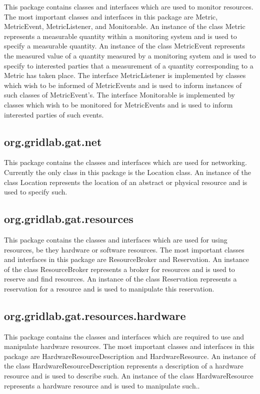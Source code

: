 \documentclass[$Date: 2003/06/26 19:29:31 $]{glabarticle}
\begin{document}
This package contains classes and interfaces which are used to monitor resources. The most important
classes and interfaces in this package are Metric, MetricEvent, MetricListener, and Monitorable. An 
instance of the class Metric represents a measurable quantity within a monitoring system and is used to specify
a measurable quantity. An instance of the class MetricEvent represents the measured value of a
quantity measured by a monitoring system and is used to specify to interested parties that a measurement
of a quantity corresponding to a Metric has taken place. The interface MetricListener is implemented by
classes which wish to be informed of MetricEvents and is used to inform instances of such classes of
MetricEvent's. The interface Monitorable is implemented by classes which wish to be monitored for
MetricEvents and is used to inform interested parties of such events.

\subsection{org.gridlab.gat.net}

This package contains the classes and interfaces which are used for networking. Currently the only class
in this package is the Location class. An instance of the class Location represents the location of an
abstract or physical resource and is used to specify such.

\subsection{org.gridlab.gat.resources}

This package contains the classes and interfaces which are used for using resources, be they hardware
or software resources. The most important classes and interfaces in this package are ResourceBroker
and Reservation. An instance of the class ResourceBroker represents a broker for resources and is used 
to reserve and find resources. An instance of the class Reservation represents a reservation for a
resource and is used to manipulate this reservation.

\subsection{org.gridlab.gat.resources.hardware}

This package contains the classes and interfaces which are required to use and manipulate hardware
resources. The most important classes and interfaces in this package are HardwareResourceDescription
and HardwareResource. An instance of the class HardwareResourceDescription represents a description
of a hardware resource and is used to describe such. An instance of the class HardwareResource represents
a hardware resource and is used to manipulate such..
\end{document}
